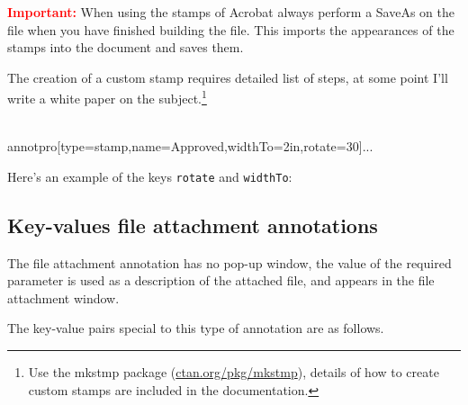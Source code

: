 \documentclass[12pt]{article}
\def\pkg{\textsf}
\let\app\textsf
\let\uif\textsf
\begin{document}
\textbf{\textcolor{red}{Important:}} When using the stamps of
\app{Acrobat} always perform a \uif{SaveAs} on the file when you have finished
building the file. This imports the appearances of the stamps into
the document and saves them.

\redpoint The creation of a custom stamp requires detailed list of steps, at
some point I'll write a white paper on the subject.\footnote{Use the \pkg{mkstmp} package
(\href{http://ctan.org/pkg/mkstmp}{ctan.org/pkg/mkstmp}),
details of how to create custom stamps are included in the documentation.}

\begin{defineJS}{\approvedStmp}
\\annotpro[type=stamp,name=Approved,widthTo=2in,rotate=30]{...}
\end{defineJS}

\newtopic
Here's an example of the keys \texttt{rotate} and \texttt{widthTo}:
\begin{center}
\end{center}

\subsection{Key-values file attachment annotations}

The file attachment annotation has no pop-up window, the value of the required parameter is used as a description
of the attached file, and appears in the file attachment window.

The key-value pairs special to this type of annotation are as follows.
\end{document}
